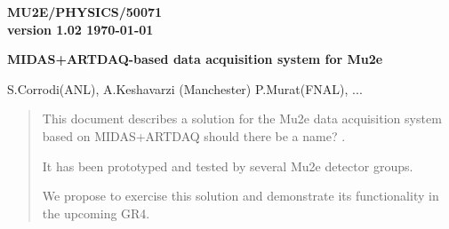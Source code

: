 \documentclass[12pt]{article}
\begin{document}
\begin{titlepage}
  \begin{flushright}
    \bf {MU2E/PHYSICS/50071} \\
    version 1.02
    \today
 \end{flushright}

  \vspace{1cm}

  \begin{center}
    {\Large \bf MIDAS+ARTDAQ-based data acquisition system for Mu2e
      \vspace{0.3in}
    }

    \vspace{1cm}
    S.Corrodi(ANL), A.Keshavarzi (Manchester) P.Murat(FNAL), ...

    \vspace{0.3cm}

    \vspace{0.8cm}
  \end{center}

  \begin{abstract}
    \vspace{0.2in}

    This document describes a solution for the Mu2e data acquisition
    system based on MIDAS+ARTDAQ {\red should there be a name? }.

    It has been prototyped and tested by several Mu2e
    detector groups. 

    We propose to exercise this solution and demonstrate
    its functionality in the upcoming GR4.
  \end{abstract}

\end{titlepage}
%
%
%
{\tableofcontents}

% 

\newpage
\end{document}
